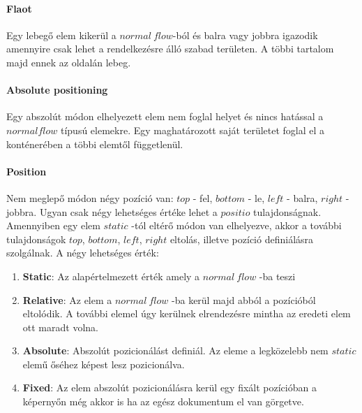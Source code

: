 \documentclass[12pt]{report}
\theoremstyle{definition}
\begin{document}
	\paragraph{Flaot} Egy lebegő elem kikerül a $normal\ flow$-ból és balra vagy jobbra igazodik amennyire csak lehet a rendelkezésre álló szabad területen. A többi tartalom majd ennek az oldalán lebeg.
	
	\paragraph{Absolute positioning}Egy abszolút módon elhelyezett elem nem foglal helyet és nincs hatással a $normal flow$ típusú elemekre. Egy maghatározott saját területet foglal el a konténerében a többi elemtől függetlenül.
	
	\paragraph{Position}Nem meglepő módon négy pozíció van: $top$ - fel, $bottom$ - le, $left$ - balra, $right$ - jobbra. Ugyan csak négy lehetséges értéke lehet a $positio$ tulajdonságnak. Amennyiben egy elem $static$ -tól eltérő módon van elhelyezve, akkor a további tulajdonságok $top$, $bottom$, $left$, $right$ eltolás, illetve pozíció definiálásra szolgálnak. A négy lehetséges érték:
	
	\begin{enumerate}
		\item\textbf{Static}: Az alapértelmezett érték amely a $normal\ flow$ -ba teszi
		\item\textbf{Relative}: Az elem a $normal\ flow$ -ba kerül majd abból a pozícióból eltolódik. A további elemel úgy kerülnek elrendezésre mintha az eredeti elem ott maradt volna.
		\item\textbf{Absolute}: Abszolút pozicionálást definiál. Az eleme a legközelebb nem $static$ elemű őséhez képest lesz pozicionálva.
		\item\textbf{Fixed}: Az elem abszolút pozicionálásra kerül egy fixált pozícióban a képernyőn még akkor is ha az egész dokumentum el van görgetve.
	\end{enumerate}
	
\end{document}
